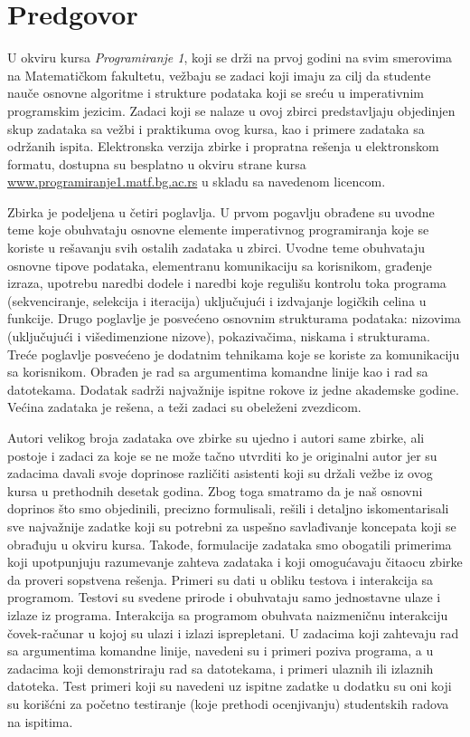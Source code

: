 \chapter*{Predgovor}

U okviru kursa {\em Programiranje 1}, koji se drži na prvoj godini na svim smerovima na Matematičkom fakultetu, vežbaju se zadaci koji imaju za cilj da studente nauče osnovne algoritme i strukture podataka koji se sreću u imperativnim programskim jezicim. Zadaci koji se nalaze u ovoj zbirci predstavljaju 
objedinjen skup zadataka sa vežbi i praktikuma ovog kursa, kao i primere 
zadataka sa održanih ispita. 
Elektronska verzija zbirke i propratna rešenja u elektronskom formatu, dostupna su 
besplatno u okviru strane kursa \url{www.programiranje1.matf.bg.ac.rs} u skladu sa navedenom licencom.

Zbirka je podeljena u četiri poglavlja. U prvom pogavlju obrađene su uvodne teme koje obuhvataju osnovne elemente imperativnog programiranja koje se koriste u rešavanju svih ostalih zadataka u zbirci. Uvodne teme obuhvataju osnovne tipove podataka, elementranu komunikaciju sa korisnikom, građenje izraza, upotrebu naredbi dodele i naredbi koje regulišu kontrolu toka programa (sekvenciranje, selekcija i iteracija) uključujući i izdvajanje logičkih celina u funkcije. Drugo poglavlje je posvećeno osnovnim strukturama podataka: nizovima (uključujući i višedimenzione nizove), pokazivačima, niskama i strukturama. Treće poglavlje posvećeno je dodatnim tehnikama koje se koriste za komunikaciju sa korisnikom. Obrađen je rad sa argumentima komandne linije kao i rad sa datotekama. Dodatak sadrži najvažnije ispitne rokove iz jedne akademske godine. Većina zadataka je rešena, a teži zadaci su obeleženi zvezdicom.


Autori velikog broja zadataka ove zbirke su ujedno i autori same zbirke, ali postoje 
i zadaci za koje se ne može tačno utvrditi ko je originalni autor jer su zadacima 
davali svoje doprinose različiti asistenti koji su držali vežbe iz ovog kursa u 
prethodnih desetak godina. Zbog toga smatramo da je naš osnovni doprinos 
što smo objedinili, precizno formulisali, rešili i detaljno iskomentarisali 
sve najvažnije zadatke koji su potrebni za uspešno savlađivanje koncepata 
koji se obrađuju u okviru kursa. Takođe, formulacije zadataka smo obogatili
primerima koji upotpunjuju razumevanje zahteva zadataka i koji omogućavaju
čitaocu zbirke da proveri sopstvena rešenja. Primeri su dati u obliku 
testova i interakcija sa programom. Testovi su svedene prirode i obuhvataju 
samo jednostavne ulaze i izlaze iz programa. Interakcija sa programom obuhvata 
naizmeničnu interakciju čovek-računar u kojoj su ulazi i izlazi isprepletani. U zadacima koji zahtevaju rad sa argumentima komandne linije, navedeni su i primeri poziva programa, a u zadacima koji demonstriraju rad sa datotekama, i primeri ulaznih ili izlaznih datoteka. Test primeri koji su navedeni uz ispitne zadatke u dodatku su oni koji su korišćni za 
početno testiranje (koje prethodi ocenjivanju) studentskih radova na ispitima.

